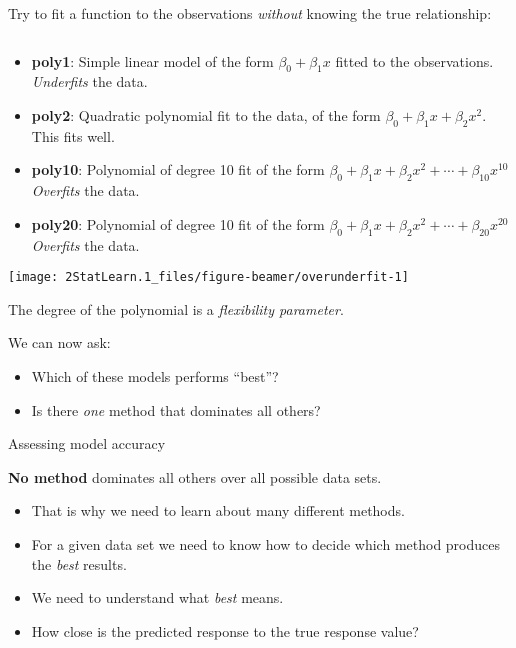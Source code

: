 \documentclass[ignorenonframetext,]{beamer}
\providecommand{\tightlist}{%
  \setlength{\itemsep}{0pt}\setlength{\parskip}{0pt}}
\begin{document}
\begin{frame}

Try to fit a function to the observations \emph{without} knowing the
true relationship:

\(~\)

\begin{itemize}
\item
  \textbf{poly1}: Simple linear model of the form \(\beta_0+\beta_1 x\)
  fitted to the observations. \emph{Underfits} the data.
\item
  \textbf{poly2}: Quadratic polynomial fit to the data, of the form
  \(\beta_0+\beta_1 x +\beta_2 x^2\). This fits well.
\item
  \textbf{poly10}: Polynomial of degree 10 fit of the form
  \(\beta_0+\beta_1 x +\beta_2 x^2+\cdots +\beta_{10}x^{10}\)
  \emph{Overfits} the data.
\item
  \textbf{poly20}: Polynomial of degree 10 fit of the form
  \(\beta_0+\beta_1 x +\beta_2 x^2+\cdots +\beta_{20}x^{20}\)
  \emph{Overfits} the data.
\end{itemize}

\end{frame}

\begin{frame}

\begin{center}\texttt{[image: 2StatLearn.1\_files/figure-beamer/overunderfit-1]} \end{center}

The degree of the polynomial is a \emph{flexibility parameter}.

\end{frame}

\begin{frame}

We can now ask:

\begin{itemize}
\item
  Which of these models performs ``best''?
\item
  Is there \emph{one} method that dominates all others?
\end{itemize}

\end{frame}

\begin{frame}{Assessing model accuracy}
\protect\hypertarget{assessing-model-accuracy}{}

\textbf{No method} dominates all others over all possible data sets.

\begin{itemize}
\tightlist
\item
  That is why we need to learn about many different methods.
\item
  For a given data set we need to know how to decide which method
  produces the \emph{best} results.
\item
  We need to understand what \emph{best} means.
\item
  How close is the predicted response to the true response value?
\end{itemize}

\end{frame}
\end{document}
